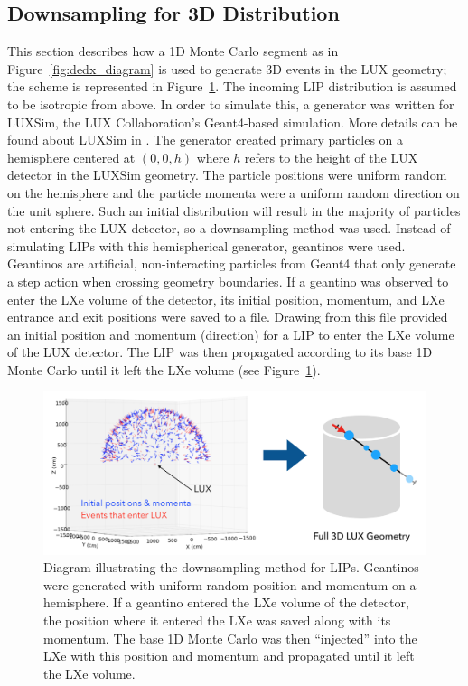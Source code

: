  
\subsection{Downsampling for 3D Distribution}
This section describes how a 1D Monte Carlo segment as in Figure~\ref{fig:dedx_diagram} is used to generate 3D events in the \ac{LUX} geometry; the scheme is represented in Figure~\ref{fig:downsample}. The incoming \ac{LIP} distribution is assumed to be isotropic from above. In order to simulate this, a generator was written for LUXSim, the \ac{LUX} Collaboration's Geant4-based simulation. More details can be found about LUXSim in \cite{LUXSim}. The generator created primary particles on a hemisphere centered at $(0,0,h)$ where $h$ refers to the height of the \ac{LUX} detector in the LUXSim geometry. The particle positions were uniform random on the hemisphere and the particle momenta were a uniform random direction on the unit sphere. Such an initial distribution will result in the majority of particles not entering the \ac{LUX} detector, so a downsampling method was used. Instead of simulating \ac{LIP}s with this hemispherical generator, geantinos were used. Geantinos are artificial, non-interacting particles from Geant4 that only generate a step action when crossing geometry boundaries. If a geantino was observed to enter the \ac{LXe} volume of the detector, its initial position, momentum, and \ac{LXe} entrance and exit positions were saved to a file. Drawing from this file provided an initial position and momentum (direction) for a \ac{LIP} to enter the \ac{LXe} volume of the \ac{LUX} detector. The \ac{LIP} was then propagated according to its base 1D Monte Carlo until it left the \ac{LXe} volume (see Figure~\ref{fig:downsample}).


\begin{figure}[htbp]
\begin{center}
\includegraphics[width=\textwidth]{figures/lips/downsample.png}
\caption{Diagram illustrating the downsampling method for \acs{LIP}s. Geantinos were generated with uniform random position and momentum on a hemisphere. If a geantino entered the \acs{LXe} volume of the detector, the position where it entered the \acs{LXe} was saved along with its momentum. The base 1D Monte Carlo was then ``injected''  into the \acs{LXe} with this position and momentum and propagated until it left the \acs{LXe} volume. }
\label{fig:downsample}
\end{center}
\end{figure}

